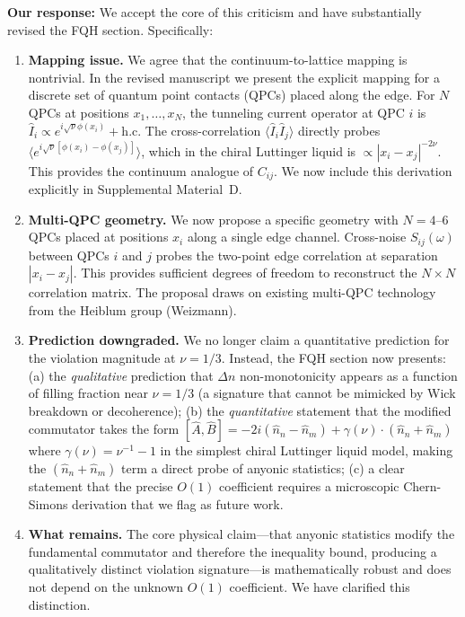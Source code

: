 \documentclass[11pt,a4paper]{article}
\begin{document}
\textbf{Our response:} We accept the core of this criticism and have substantially revised the FQH section. Specifically:

\begin{enumerate}[leftmargin=*]
\item \textbf{Mapping issue.} We agree that the continuum-to-lattice mapping is nontrivial. In the revised manuscript we present the explicit mapping for a discrete set of quantum point contacts (QPCs) placed along the edge. For $N$ QPCs at positions $x_1, \dots, x_N$, the tunneling current operator at QPC $i$ is $\hat{I}_i \propto e^{i\sqrt{\nu}\phi(x_i)} + \text{h.c.}$ The cross-correlation $\langle \hat{I}_i \hat{I}_j \rangle$ directly probes $\langle e^{i\sqrt{\nu}[\phi(x_i) - \phi(x_j)]} \rangle$, which in the chiral Luttinger liquid is $\propto |x_i - x_j|^{-2\nu}$. This provides the continuum analogue of $C_{ij}$. We now include this derivation explicitly in Supplemental Material~D.

\item \textbf{Multi-QPC geometry.} We now propose a specific geometry with $N = 4$--$6$ QPCs placed at positions $x_i$ along a single edge channel. Cross-noise $S_{ij}(\omega)$ between QPCs $i$ and $j$ probes the two-point edge correlation at separation $|x_i - x_j|$. This provides sufficient degrees of freedom to reconstruct the $N \times N$ correlation matrix. The proposal draws on existing multi-QPC technology from the Heiblum group (Weizmann).

\item \textbf{Prediction downgraded.} We no longer claim a quantitative prediction for the violation magnitude at $\nu = 1/3$. Instead, the FQH section now presents: (a) the \emph{qualitative} prediction that $\Delta n$ non-monotonicity appears as a function of filling fraction near $\nu = 1/3$ (a signature that cannot be mimicked by Wick breakdown or decoherence); (b) the \emph{quantitative} statement that the modified commutator takes the form $[\hat{A}, \hat{B}] = -2i(\hat{n}_n - \hat{n}_m) + \gamma(\nu) \cdot (\hat{n}_n + \hat{n}_m)$ where $\gamma(\nu) = \nu^{-1} - 1$ in the simplest chiral Luttinger liquid model, making the $(\hat{n}_n + \hat{n}_m)$ term a direct probe of anyonic statistics; (c) a clear statement that the precise $O(1)$ coefficient requires a microscopic Chern-Simons derivation that we flag as future work.

\item \textbf{What remains.} The core physical claim---that anyonic statistics modify the fundamental commutator and therefore the inequality bound, producing a qualitatively distinct violation signature---is mathematically robust and does not depend on the unknown $O(1)$ coefficient. We have clarified this distinction.
\end{enumerate}
\end{document}
